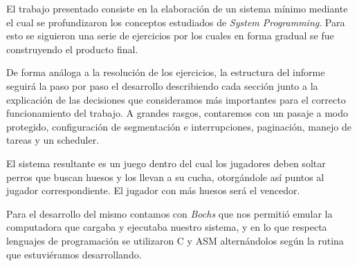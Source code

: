 El trabajo presentado consiste en la elaboración de un sistema mínimo mediante
el cual se profundizaron los conceptos estudiados de \textit{System
Programming}. Para esto se siguieron una serie de ejercicios por los cuales en
forma gradual se fue construyendo el producto final.

De forma análoga a la resolución de los ejercicios, la estructura del informe
seguirá la paso por paso el desarrollo describiendo cada sección junto a la
explicación de las decisiones que consideramos más importantes para el correcto
funcionamiento del trabajo. A grandes rasgos, contaremos con un pasaje a modo
protegido, configuración de segmentación e interrupciones, paginación, manejo de
tareas y un scheduler.

El sistema resultante es un juego dentro del cual los jugadores deben soltar
perros que buscan huesos y los llevan a su cucha, otorgándole así puntos al
jugador correspondiente. El jugador con más huesos será el vencedor.

Para el desarrollo del mismo contamos con \textit{Bochs} que nos permitió emular
la computadora que cargaba y ejecutaba nuestro sistema, y en lo que respecta
lenguajes de programación se utilizaron \textsc{C} y \textsc{ASM} alternándolos
según la rutina que estuviéramos desarrollando.
